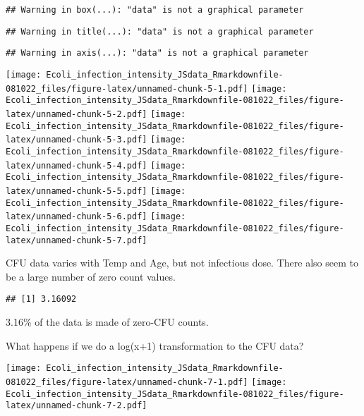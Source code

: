 \documentclass[
]{article}
\newenvironment{Shaded}{\begin{snugshade}}{\end{snugshade}}
\newcommand{\CommentTok}[1]{\textcolor[rgb]{0.56,0.35,0.01}{\textit{#1}}}
\newcommand{\DecValTok}[1]{\textcolor[rgb]{0.00,0.00,0.81}{#1}}
\newcommand{\FunctionTok}[1]{\textcolor[rgb]{0.00,0.00,0.00}{#1}}
\newcommand{\NormalTok}[1]{#1}
\newcommand{\SpecialCharTok}[1]{\textcolor[rgb]{0.00,0.00,0.00}{#1}}
\begin{document}
\begin{verbatim}
## Warning in box(...): "data" is not a graphical parameter
\end{verbatim}

\begin{verbatim}
## Warning in title(...): "data" is not a graphical parameter
\end{verbatim}

\begin{verbatim}
## Warning in axis(...): "data" is not a graphical parameter
\end{verbatim}

\texttt{[image: Ecoli\_infection\_intensity\_JSdata\_Rmarkdownfile-081022\_files/figure-latex/unnamed-chunk-5-1.pdf]}
\texttt{[image: Ecoli\_infection\_intensity\_JSdata\_Rmarkdownfile-081022\_files/figure-latex/unnamed-chunk-5-2.pdf]}
\texttt{[image: Ecoli\_infection\_intensity\_JSdata\_Rmarkdownfile-081022\_files/figure-latex/unnamed-chunk-5-3.pdf]}
\texttt{[image: Ecoli\_infection\_intensity\_JSdata\_Rmarkdownfile-081022\_files/figure-latex/unnamed-chunk-5-4.pdf]}
\texttt{[image: Ecoli\_infection\_intensity\_JSdata\_Rmarkdownfile-081022\_files/figure-latex/unnamed-chunk-5-5.pdf]}
\texttt{[image: Ecoli\_infection\_intensity\_JSdata\_Rmarkdownfile-081022\_files/figure-latex/unnamed-chunk-5-6.pdf]}
\texttt{[image: Ecoli\_infection\_intensity\_JSdata\_Rmarkdownfile-081022\_files/figure-latex/unnamed-chunk-5-7.pdf]}

CFU data varies with Temp and Age, but not infectious dose. There also
seem to be a large number of zero count values.

\begin{Shaded}
\end{Shaded}

\begin{verbatim}
## [1] 3.16092
\end{verbatim}

3.16\% of the data is made of zero-CFU counts.

What happens if we do a log(x+1) transformation to the CFU data?

\texttt{[image: Ecoli\_infection\_intensity\_JSdata\_Rmarkdownfile-081022\_files/figure-latex/unnamed-chunk-7-1.pdf]}
\texttt{[image: Ecoli\_infection\_intensity\_JSdata\_Rmarkdownfile-081022\_files/figure-latex/unnamed-chunk-7-2.pdf]}
\end{document}
